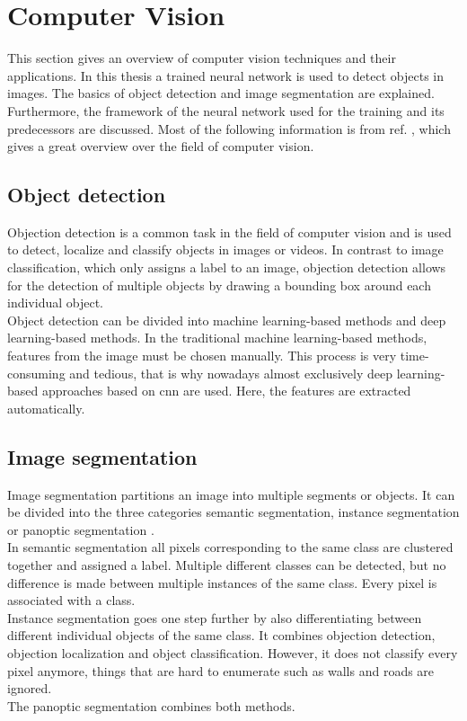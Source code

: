 \section{Computer Vision}
\label{sec:computer_vision}
This section gives an overview of computer vision techniques and their applications.
In this thesis a trained neural network is used to detect objects in images.
The basics of object detection and image segmentation are explained.
Furthermore, the framework of the neural network used for the training and its predecessors are discussed.
Most of the following information is from ref. \cite{Szeliski2022}, which gives a great overview over the field of computer vision.


\subsection{Object detection}
Objection detection is a common task in the field of computer vision and is used to detect, localize and classify objects in images or videos.
In contrast to image classification, which only assigns a label to an image, objection detection allows for the detection of multiple objects by drawing a bounding box around each individual object.\\
Object detection can be divided into machine learning-based methods and deep learning-based methods.
In the traditional machine learning-based methods, features from the image must be chosen manually.
This process is very time-consuming and tedious, that is why nowadays almost exclusively deep learning-based approaches based on \gls{cnn} are used.
Here, the features are extracted automatically.


\subsection{Image segmentation}
Image segmentation partitions an image into multiple segments or objects.
It can be divided into the three categories semantic segmentation, instance segmentation or panoptic segmentation \cite{Minaee2021}.\\
In semantic segmentation all pixels corresponding to the same class are clustered together and assigned a label.
Multiple different classes can be detected, but no difference is made between multiple instances of the same class.
Every pixel is associated with a class.\\
Instance segmentation goes one step further by also differentiating between different individual objects of the same class.
It combines objection detection, objection localization and object classification.
However, it does not classify every pixel anymore, things that are hard to enumerate such as walls and roads are ignored.\\
The panoptic segmentation combines both methods.


